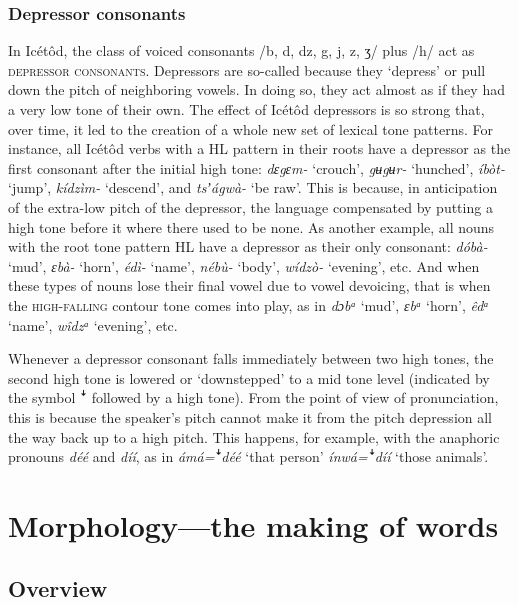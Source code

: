 \subsubsection{Depressor consonants}

In Icétôd, the class of voiced consonants /b, d, dz, g, j, z, ʒ/ plus /h/ act as \textsc{depressor consonants}. Depressors are so-called because they ‘depress’ or pull down the pitch of neighboring vowels. In doing so, they act almost as if they had a very low tone of their own. The effect of Icétôd depressors is so strong that, over time, it led to the creation of a whole new set of lexical tone patterns. For instance, all Icétôd verbs with a HL pattern in their roots have a depressor as the first consonant after the initial high tone: \textit{dɛgɛm- }‘crouch’, \textit{gʉgʉr- }‘hunched’, \textit{íbòt- }‘jump’, \textit{kídzìm- }‘descend’, and \textit{tsʼágwà- }‘be raw’. This is because, in anticipation of the extra-low pitch of the depressor, the language compensated by putting a high tone before it where there used to be none. As another example, all nouns with the root tone pattern HL have a depressor as their only consonant: \textit{dóbà- }‘mud’, \textit{ɛbà- }‘horn’, \textit{édì- }‘name’, \textit{nébù- }‘body’, \textit{wídzò- }‘evening’, etc. And when these types of nouns lose their final vowel due to vowel devoicing, that is when the \textsc{high-falling }contour tone comes into play, as in \textit{dɔbᵃ }‘mud’, \textit{ɛbᵃ} ‘horn’, \textit{êdᵃ} ‘name’, \textit{wîdzᵃ }‘evening’, etc.

Whenever a depressor consonant falls immediately between two high tones, the second high tone is lowered or ‘downstepped’ to a mid tone level (indicated by the symbol ꜜ followed by a high tone). From the point of view of pronunciation, this is because the speaker’s pitch cannot make it from the pitch depression all the way back up to a high pitch. This happens, for example, with the anaphoric pronouns \textit{déé }and \textit{díí}, as in \textit{ámá=}\textit{ꜜ}\textit{déé }‘that person’ \textit{ínwá=ꜜdíí }‘those animals’.
 
\section{Morphology—the making of words}
 
\subsection{Overview}


